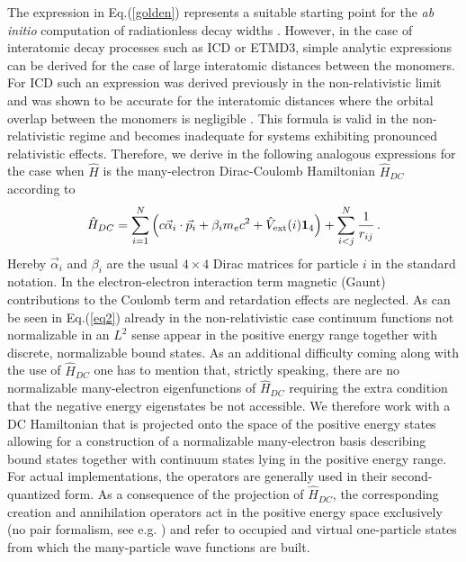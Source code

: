 The expression in Eq.(\ref{golden}) represents a suitable starting point for
the {\it ab initio} computation of radiationless decay widths \cite{Aaberg82,Averbukh09_2}.
However, in the case of interatomic decay processes such as ICD or ETMD3,
simple analytic expressions can be derived for the case of large interatomic
distances between the monomers. For ICD such an expression was derived previously
in the non-relativistic limit and was shown to be accurate for the interatomic
distances where the orbital overlap between the monomers is
negligible \cite{Averbukh04,Gokhberg10_1}. This formula is valid in the non-relativistic
regime and becomes inadequate for systems exhibiting pronounced relativistic effects.
Therefore, we derive in the following analogous expressions for the case
when $\hat{H}$ is the many-electron Dirac-Coulomb Hamiltonian $\hat{H}_{DC}$ according
to
\begin{equation}
    \hat{H}_{DC}=\sum_{i=1}^N\left(c\vec{\alpha}_i\cdot\vec{p}_i + \beta_i m_ec^2 +
   \hat{V}_{\rm ext}(i){\bf{1}}_4\right) + \sum_{i<j}^N\frac{1}{r_{ij}}\, .
\end{equation}
Hereby $\vec{\alpha}_i$ and $\beta_i$ are the usual $4\times 4$ Dirac matrices
for particle $i$ in the standard notation.
In the electron-electron interaction term magnetic (Gaunt) contributions to
the Coulomb term and retardation effects are neglected. As can be seen in
Eq.(\ref{eq2}) already in the non-relativistic case continuum functions not
normalizable in an $L^2$ sense appear in the positive energy range together with
discrete, normalizable bound states. As an additional difficulty coming along with
the use of $\hat{H}_{DC}$ one has to mention that, strictly speaking, there are no
normalizable many-electron eigenfunctions of $\hat{H}_{DC}$
\cite{brown51, sucher80, pestka2006, bylicki2008} requiring the extra condition
that the negative energy eigenstates be not accessible. We therefore work with a
DC Hamiltonian that is projected onto the space of the positive energy states
allowing for a construction of a normalizable many-electron basis describing
bound states together with continuum states lying in the positive energy range.
For actual implementations, the operators are generally used in their second-quantized
form. As a consequence of the projection of $\hat{H}_{DC}$, the corresponding
creation and annihilation operators act in the positive energy space exclusively
(no pair formalism, see e.g. \cite{grant88}) and refer to occupied and virtual
one-particle states from which the many-particle wave functions are built.


